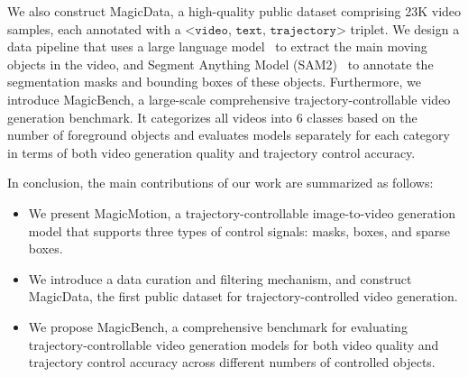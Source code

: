We also construct MagicData, a high-quality public dataset comprising 23K video samples, each annotated with a $ \texttt{<video, text, trajectory>}$ triplet. 
We design a data pipeline that uses a large language model~\cite{touvron2023llama} to extract the main moving objects in the video, and Segment Anything Model (SAM2)~\cite{ren2024grounded, ravi2024sam} to annotate the segmentation masks and bounding boxes of these objects. 
Furthermore, we introduce MagicBench, a large-scale comprehensive trajectory-controllable video generation benchmark. It categorizes all videos into 6 classes based on the number of foreground objects and evaluates models separately for each category in terms of both video generation quality and trajectory control accuracy.

In conclusion, the main contributions of our work are summarized as follows:

\begin{itemize}
    \item We present MagicMotion, a trajectory-controllable image-to-video generation model that supports three types of control signals: masks, boxes, and sparse boxes.
    \item We introduce a data curation and filtering mechanism, and construct MagicData, the first public dataset for trajectory-controlled video generation.
    \item We propose MagicBench, a comprehensive benchmark for evaluating trajectory-controllable video generation models for both video quality and trajectory control accuracy across different numbers of controlled objects.
\end{itemize}
